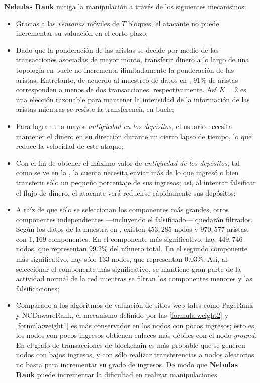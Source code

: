 \textbf{Nebulas Rank} mitiga la manipulación a través de los siguientes mecanismos:
\begin{itemize}
	\item Gracias a las \textit{ventanas} móviles de $T$ bloques, el atacante no puede incrementar su valuación en el corto plazo;
	\item Dado que la ponderación de las aristas se decide por medio de las transacciones asociadas de mayor monto, transferir dinero a lo largo de una topología en bucle no incrementa ilimitadamente la ponderación de las aristas. Entretanto, de acuerdo al muestreo de datos en , $91\%$ de aristas corresponden a menos de dos transacciones, respectivamente. Así $K=2$ es una elección razonable para mantener la intensidad de la información de las aristas mientras se resiste la transferencia en bucle;
	\item Para lograr una mayor \textit{antigüedad en los depósitos}, el usuario necesita mantener el dinero en su dirección durante un cierto lapso de tiempo, lo que reduce la velocidad de este ataque;
	\item Con el fin de obtener el máximo valor de \textit{antigüedad de los depósitos}, tal como se ve en la , la cuenta necesita enviar más de lo que ingresó o bien transferir sólo un pequeño porcentaje de sus ingresos; así, al intentar falsificar el flujo de dinero, el atacante verá reducirse rápidamente sus depósitos;
	\item A raíz de que sólo se seleccionan los componentes más grandes, otros componentes independientes —incluyendo el falsificado— quedarán filtrados. Según los datos de la muestra en , existen $453,285$ nodos y $970,577$ aristas, con $1,169$ componentes. En el componente más significativo, hay $449,746$ nodos, que representan $99.2\%$ del número total. En el segundo componente más significativo, hay sólo $133$ nodos, que representan $0.03\%$. Así, al seleccionar el componente más significativo, se mantiene gran parte de la actividad normal de la red mientras se filtran los componentes menores y las falsificaciones;
	\item Comparado a los algoritmos de valuación de sitios web tales como PageRank y NCDawareRank\cite{Nikolakopoulos2013}, el mecanismo definido por las \ref{formula:weight2} y \ref{formula:weight1} es más conservador en los nodos con pocos ingresos; esto es, los nodos con pocos ingresos obtienen enlaces más débiles con el nodo \textit{ground}. En el grafo de transacciones de blockchain es más probable que se generen nodos con bajos ingresos, y con sólo realizar transferencias a nodos aleatorios no basta para incrementar su grado de ingresos. De modo que \textbf{Nebulas Rank} puede incrementar la dificultad en realizar manipulaciones.
\end{itemize}

